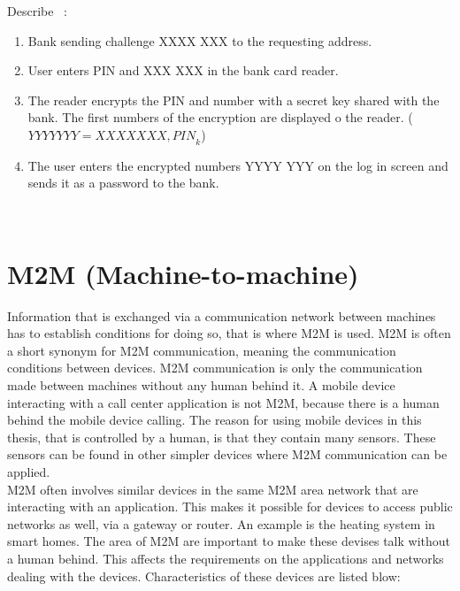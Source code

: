 Describe ~:
\begin{enumerate}
	\item Bank sending challenge XXXX XXX to the requesting address.
	\item User enters PIN and XXX XXX in the bank card reader.
	\item The reader encrypts the PIN and number with a secret key shared with the bank. The first numbers of the encryption are displayed o the reader. ($YYYY YYY = {XXXX XXX, PIN}_k$) 
	\item The user enters the encrypted numbers YYYY YYY on the log in screen and sends it as a password to the bank.
\end{enumerate}
~\cite[ch.3]{rosssec}

\section{M2M (Machine-to-machine)}\label{sec:m2mauth}
Information that is exchanged via a communication network between machines has to establish conditions for doing so, that is where M2M is used. M2M is often a short synonym for M2M communication, meaning the communication conditions between devices. M2M communication is only the communication made between machines without any human behind it. A mobile device interacting with a call center application is not M2M, because there is a human behind the mobile device calling. 
The reason for using mobile devices in this thesis, that is controlled by a human, is that they contain many sensors. These sensors can be found in other simpler devices where M2M communication can be applied.
\\
M2M often involves similar devices in the same M2M area network that are interacting with an application. This makes it possible for devices to access public networks as well, via a gateway or router. An example is the heating system in smart homes. 
The area of M2M are important to make these devises talk without a human behind. This affects the requirements on the applications and networks dealing with the devices. Characteristics of these devices are listed blow:
